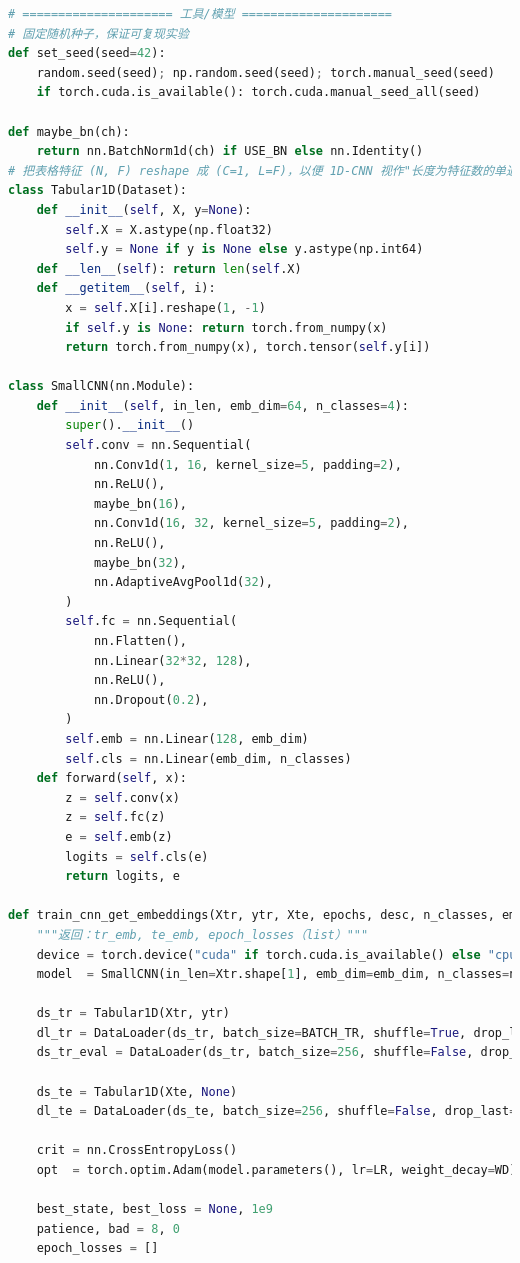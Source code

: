 \documentclass[a4paper]{CPIPC}
\numberwithin{equation}{section}
\begin{document}
\begin{lstlisting}[language=Python, caption=CNN + SVM Classifier]
# ===================== 工具/模型 =====================
# 固定随机种子，保证可复现实验
def set_seed(seed=42):
    random.seed(seed); np.random.seed(seed); torch.manual_seed(seed)
    if torch.cuda.is_available(): torch.cuda.manual_seed_all(seed)

def maybe_bn(ch):
    return nn.BatchNorm1d(ch) if USE_BN else nn.Identity()
# 把表格特征 (N, F) reshape 成 (C=1, L=F)，以便 1D-CNN 视作"长度为特征数的单通道序列"。
class Tabular1D(Dataset):
    def __init__(self, X, y=None):
        self.X = X.astype(np.float32)
        self.y = None if y is None else y.astype(np.int64)
    def __len__(self): return len(self.X)
    def __getitem__(self, i):
        x = self.X[i].reshape(1, -1)
        if self.y is None: return torch.from_numpy(x)
        return torch.from_numpy(x), torch.tensor(self.y[i])

class SmallCNN(nn.Module):
    def __init__(self, in_len, emb_dim=64, n_classes=4):
        super().__init__()
        self.conv = nn.Sequential(
            nn.Conv1d(1, 16, kernel_size=5, padding=2),
            nn.ReLU(),
            maybe_bn(16),
            nn.Conv1d(16, 32, kernel_size=5, padding=2),
            nn.ReLU(),
            maybe_bn(32),
            nn.AdaptiveAvgPool1d(32),
        )
        self.fc = nn.Sequential(
            nn.Flatten(),
            nn.Linear(32*32, 128),
            nn.ReLU(),
            nn.Dropout(0.2),
        )
        self.emb = nn.Linear(128, emb_dim)
        self.cls = nn.Linear(emb_dim, n_classes)
    def forward(self, x):
        z = self.conv(x)
        z = self.fc(z)
        e = self.emb(z)
        logits = self.cls(e)
        return logits, e

def train_cnn_get_embeddings(Xtr, ytr, Xte, epochs, desc, n_classes, emb_dim):
    """返回：tr_emb, te_emb, epoch_losses（list）"""
    device = torch.device("cuda" if torch.cuda.is_available() else "cpu")
    model  = SmallCNN(in_len=Xtr.shape[1], emb_dim=emb_dim, n_classes=n_classes).to(device)

    ds_tr = Tabular1D(Xtr, ytr)
    dl_tr = DataLoader(ds_tr, batch_size=BATCH_TR, shuffle=True, drop_last=False)
    ds_tr_eval = DataLoader(ds_tr, batch_size=256, shuffle=False, drop_last=False)

    ds_te = Tabular1D(Xte, None)
    dl_te = DataLoader(ds_te, batch_size=256, shuffle=False, drop_last=False)

    crit = nn.CrossEntropyLoss()
    opt  = torch.optim.Adam(model.parameters(), lr=LR, weight_decay=WD)

    best_state, best_loss = None, 1e9
    patience, bad = 8, 0
    epoch_losses = []


\end{lstlisting}
\end{document}
